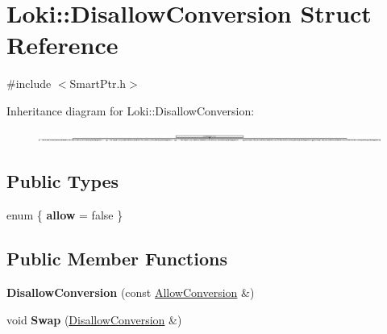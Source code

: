 \hypertarget{structLoki_1_1DisallowConversion}{}\section{Loki\+:\+:Disallow\+Conversion Struct Reference}
\label{structLoki_1_1DisallowConversion}


{\ttfamily \#include $<$Smart\+Ptr.\+h$>$}

Inheritance diagram for Loki\+:\+:Disallow\+Conversion\+:\begin{figure}[H]
\begin{center}
\leavevmode
\includegraphics[height=0.273839cm]{structLoki_1_1DisallowConversion}
\end{center}
\end{figure}
\subsection*{Public Types}
\begin{DoxyCompactItemize}
\item 
\hypertarget{structLoki_1_1DisallowConversion_ac0b69841cbb4c4eee973e76a9ef5270c}{}enum \{ {\bfseries allow} = false
 \}\label{structLoki_1_1DisallowConversion_ac0b69841cbb4c4eee973e76a9ef5270c}

\end{DoxyCompactItemize}
\subsection*{Public Member Functions}
\begin{DoxyCompactItemize}
\item 
\hypertarget{structLoki_1_1DisallowConversion_a94d33a9871dbc923001c42a2ac8fffa3}{}{\bfseries Disallow\+Conversion} (const \hyperlink{structLoki_1_1AllowConversion}{Allow\+Conversion} \&)\label{structLoki_1_1DisallowConversion_a94d33a9871dbc923001c42a2ac8fffa3}

\item 
\hypertarget{structLoki_1_1DisallowConversion_abe1793b48b05cb4f6ecfbd18e5835a92}{}void {\bfseries Swap} (\hyperlink{structLoki_1_1DisallowConversion}{Disallow\+Conversion} \&)\label{structLoki_1_1DisallowConversion_abe1793b48b05cb4f6ecfbd18e5835a92}

\end{DoxyCompactItemize}


